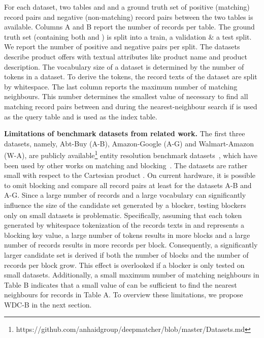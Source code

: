 \documentclass[sigconf,nonacm]{acmart}
\begin{document}
For each dataset, two tables  and  and a ground truth set of positive (matching) record pairs  and negative (non-matching) record pairs  between the two tables is available.
Columns A and B report the number of records per table.
The ground truth set (containing both  and ) is split into a train, a validation \& a test split.
We report the number of positive and negative pairs per split.
The datasets describe product offers with textual attributes like product name and product description.
The vocabulary size of a dataset is determined by the number of tokens in a dataset. To derive the tokens, the record texts of the dataset are split by whitespace.
The last column reports the maximum number of matching neighbours.
This number determines the smallest value of  necessary to find all matching record pairs between  and  during the nearest-neighbour search if  is used as the query table and  is used as the index table.

\vspace{.1cm}\noindent\textbf{Limitations of benchmark datasets from related work.}
The first three datasets, namely, Abt-Buy (A-B), Amazon-Google (A-G) and Walmart-Amazon (W-A), are publicly available\footnote{https://github.com/anhaidgroup/deepmatcher/blob/master/Datasets.md} entity resolution benchmark datasets~\cite{konda_magellan_2016}, which have been used by other works on matching and blocking~\cite{thirumuruganathan_deep_2021, mudgal_deep_2018, li_deep_2020, peeters_dual-objective_2021, peeters_supervised_2022}.
The datasets are rather small with respect to the Cartesian product . On current hardware, it is possible to omit blocking and compare all record pairs at least for the datasets A-B and A-G. Since a large number of records and a large vocabulary can significantly influence the size of the candidate set generated by a blocker, testing blockers only on small datasets is problematic. Specifically, assuming that each token generated by whitespace tokenization of the records texts in  and  represents a blocking key value, a large number of tokens results in more blocks and a large number of records results in more records per block.
Consequently, a significantly larger candidate set is derived if both the number of blocks and the number of records per block grow. This effect is overlooked if a blocker is only tested on small datasets.
Additionally, a small maximum number of matching neighbours in Table B indicates that a small value of  can be sufficient to find the nearest neighbours for records in Table A.
To overview these limitations, we propose WDC-B in the next section.
\end{document}
